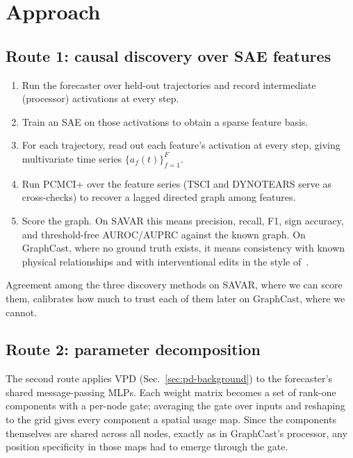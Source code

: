 \section{Approach}
\label{sec:approach}

\subsection{Route 1: causal discovery over SAE features}

\begin{enumerate}[nosep]
  \item Run the forecaster over held-out trajectories and record intermediate
        (processor) activations at every step.
  \item Train an SAE on those activations to obtain a sparse feature basis.
  \item For each trajectory, read out each feature's activation at every step,
        giving multivariate time series $\{a_f(t)\}_{f=1}^{F}$.
  \item Run PCMCI+ over the feature series (TSCI and DYNOTEARS serve as
        cross-checks) to recover a lagged directed graph among features.
  \item Score the graph. On SAVAR this means precision, recall, F1, sign accuracy,
        and threshold-free AUROC/AUPRC against the known graph. On GraphCast, where
        no ground truth exists, it means consistency with known physical
        relationships and with interventional edits in the style
        of~\cite{macmillan2025}.
\end{enumerate}

Agreement among the three discovery methods on SAVAR, where we can score them,
calibrates how much to trust each of them later on GraphCast, where we cannot.

\subsection{Route 2: parameter decomposition}

The second route applies VPD (Sec.~\ref{sec:pd-background}) to the forecaster's
shared message-passing MLPs. Each weight matrix becomes a set of rank-one
components with a per-node gate; averaging the gate over inputs and reshaping to
the grid gives every component a spatial usage map. Since the components themselves
are shared across all nodes, exactly as in GraphCast's processor, any position
specificity in those maps had to emerge through the gate.

